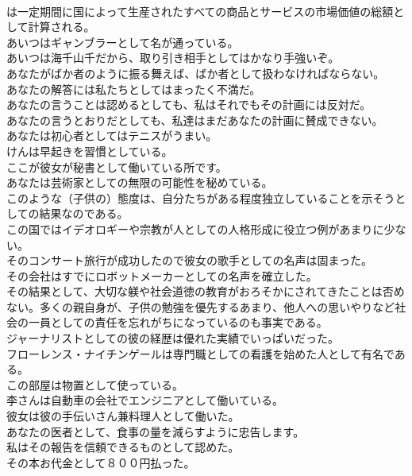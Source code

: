 \documentclass[8pt]{extreport}
\begin{document}
\begin{CJK}{UTF8}{min}
\\	は一定期間に国によって生産されたすべての商品とサービスの市場価値の総額として計算される。   
\\	あいつはギャンブラーとして名が通っている。   
\\	あいつは海千山千だから、取り引き相手としてはかなり手強いぞ。   
\\	あなたがばか者のように振る舞えば、ばか者として扱わなければならない。   
\\	あなたの解答には私たちとしてはまったく不満だ。   
\\	あなたの言うことは認めるとしても、私はそれでもその計画には反対だ。   
\\	あなたの言うとおりだとしても、私達はまだあなたの計画に賛成できない。   
\\	あなたは初心者としてはテニスがうまい。   
\\	けんは早起きを習慣としている。   
\\	ここが彼女が秘書として働いている所です。  
\\	あなたは芸術家としての無限の可能性を秘めている。  
\\	このような（子供の）態度は、自分たちがある程度独立していることを示そうとしての結果なのである。   
\\	この国ではイデオロギーや宗教が人としての人格形成に役立つ例があまりに少ない。   
\\	そのコンサート旅行が成功したので彼女の歌手としての名声は固まった。   
\\	その会社はすでにロボットメーカーとしての名声を確立した。   
\\	その結果として、大切な躾や社会道徳の教育がおろそかにされてきたことは否めない。多くの親自身が、子供の勉強を優先するあまり、他人への思いやりなど社会の一員としての責任を忘れがちになっているのも事実である。   
\\	ジャーナリストとしての彼の経歴は優れた実績でいっぱいだった。   
\\	フローレンス・ナイチンゲールは専門職としての看護を始めた人として有名である。   
\\	この部屋は物置として使っている。   
\\	李さんは自動車の会社でエンジニアとして働いている。  
\\	彼女は彼の手伝いさん兼料理人として働いた。   
\\	あなたの医者として、食事の量を減らすように忠告します。   
\\	私はその報告を信頼できるものとして認めた。   
\\	その本お代金として８００円払った。   

\end{CJK}
\end{document}
